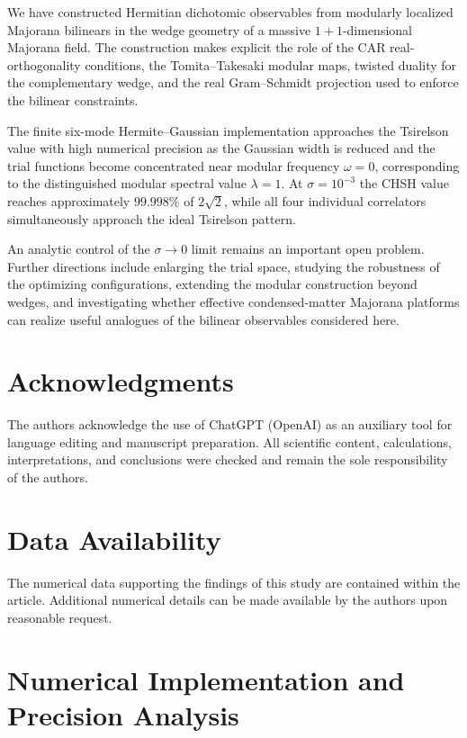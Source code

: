 \documentclass[11pt]{article}
\begin{document}
We have constructed Hermitian dichotomic observables from modularly localized Majorana bilinears in the wedge geometry of a massive $1+1$-dimensional Majorana field. The construction makes explicit the role of the CAR real-orthogonality conditions, the Tomita--Takesaki modular maps, twisted duality for the complementary wedge, and the real Gram--Schmidt projection used to enforce the bilinear constraints.

The finite six-mode Hermite--Gaussian implementation approaches the Tsirelson value with high numerical precision as the Gaussian width is reduced and the trial functions become concentrated near modular frequency $\omega=0$, corresponding to the distinguished modular spectral value $\lambda=1$. At $\sigma=10^{-3}$ the CHSH value reaches approximately $99.998\%$ of $2\sqrt2$, while all four individual correlators simultaneously approach the ideal Tsirelson pattern.

An analytic control of the $\sigma\to0$ limit remains an important open problem. Further directions include enlarging the trial space, studying the robustness of the optimizing configurations, extending the modular construction beyond wedges, and investigating whether effective condensed-matter Majorana platforms can realize useful analogues of the bilinear observables considered here.

\section*{Acknowledgments}
The authors acknowledge the use of ChatGPT (OpenAI) as an auxiliary tool for language editing and manuscript preparation. All scientific content, calculations, interpretations, and conclusions were checked and remain the sole responsibility of the authors.

\section*{Data Availability}
The numerical data supporting the findings of this study are contained within the article. Additional numerical details can be made available by the authors upon reasonable request.

\appendix

\section{Numerical Implementation and Precision Analysis}
\label{app:numerics}
\end{document}
